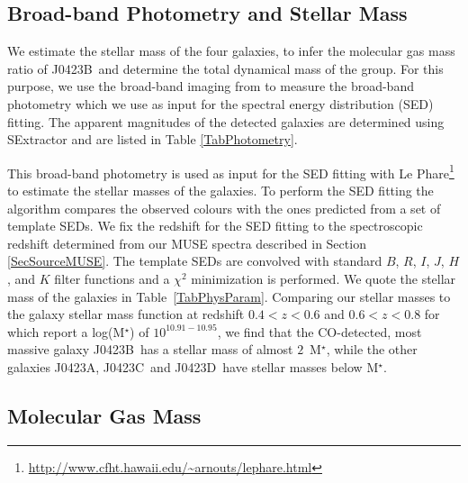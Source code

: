 \documentclass[a4paper,fleqn,usenatbib]{mnras}
\newcommand{\GalA}{J0423A}
\newcommand{\GalB}{J0423B}
\newcommand{\GalC}{J0423C}
\newcommand{\GalD}{J0423D}
\begin{document}
\subsection{Broad-band Photometry and Stellar Mass}
\label{SecBroadBandPhot}

We estimate the stellar mass of the four galaxies, to infer the molecular gas mass ratio of \GalB\ and determine the total dynamical mass of the group. For this purpose, we use the broad-band imaging from \mbox{\citet{Rao2011groundbased}} to measure the broad-band photometry which we use as input for the spectral energy distribution (SED) fitting. The apparent magnitudes of the detected galaxies are determined using SExtractor and are listed in Table \ref{TabPhotometry}. 

This broad-band photometry is used as input for the SED fitting with Le Phare\footnote{ \url{http://www.cfht.hawaii.edu/~arnouts/lephare.html}} \mbox{\citep{Arnouts1999measuring, Ilbert2006accurate}} to estimate the stellar masses of the galaxies. To perform the SED fitting the algorithm compares the observed colours with the ones predicted from a set of template SEDs. We fix the redshift for the SED fitting to the spectroscopic redshift determined from our MUSE spectra described in Section \ref{SecSourceMUSE}. The template SEDs are convolved with standard $B$, $R$, $I$, $J$, $H$, and $K$ filter functions and a $\chi^2$ minimization is performed. %
We quote the stellar mass of the galaxies in Table~\ref{TabPhysParam}. %
Comparing our stellar masses to the galaxy stellar mass function at redshift $0.4<z<0.6$ and $0.6<z<0.8$   for which \mbox{\citet{Drory2009bimodal}} report a log(M$^{\star}$) of $10^{10.91 - 10.95}$, we find that the CO-detected, most massive galaxy \GalB\ has a stellar mass of almost $2$~M$^{\star}$, while the other galaxies \GalA, \GalC\ and \GalD\ have stellar masses below M$^{\star}$.\\



\subsection{Molecular Gas Mass}
\label{SubsecMolGas}
\end{document}
